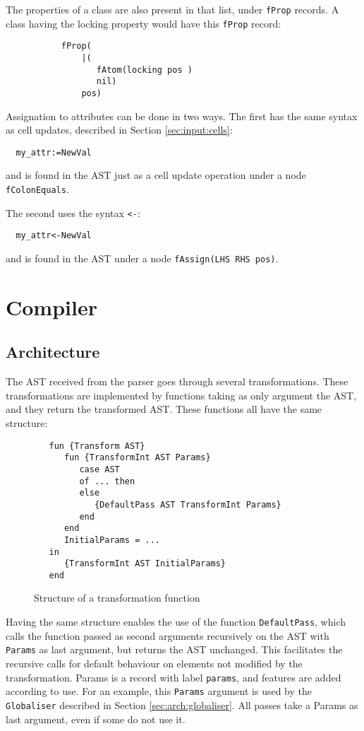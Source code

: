 \documentclass[a4paper]{memoir}
\begin{document}
The properties of a class are also present in that list, under \lstinline!fProp!
records. A class having the locking property would have this \lstinline!fProp! record:

\begin{lstlisting}
           fProp(
               |(
                  fAtom(locking pos )
                  nil)
               pos)
\end{lstlisting}

Assignation to attributes can be done in two ways. The first has the same syntax
as cell updates, described in Section \ref{sec:input:cells}:
\begin{lstlisting}
  my_attr:=NewVal
\end{lstlisting}
and is found in the AST just as a cell update operation under a node
\lstinline!fColonEquals!.

The second uses the syntax \lstinline!<-!:
\begin{lstlisting}
  my_attr<-NewVal
\end{lstlisting}
and is found in the AST under a node \lstinline!fAssign(LHS RHS pos)!.



\chapter{Compiler}
\section{Architecture}
The AST received from the parser goes through several transformations. These transformations are implemented by functions taking as only argument the AST, and they return the transformed AST.
These functions all have the same structure:
\begin{figure}[h]
\begin{lstlisting}
   fun {Transform AST}
      fun {TransformInt AST Params}
         case AST
         of ... then
         else
            {DefaultPass AST TransformInt Params}
         end
      end
      InitialParams = ...
   in
      {TransformInt AST InitialParams}
   end
\end{lstlisting}
\caption{Structure of a transformation function}
\end{figure}
Having the same structure enables the use of the function \lstinline!DefaultPass!, which calls the function passed as second arguments recursively on the AST with \lstinline!Params! as last argument, but returns the AST unchanged. This facilitates the recursive calls for default behaviour on elements not modified by the transformation.
Params is a record with label \lstinline!params!, and features are added
according to use. For an example, this \lstinline!Params! argument is used by
the \lstinline!Globaliser! described in Section \ref{sec:arch:globaliser}. All
passes take a Params as last argument, even if some do not use it. 
\end{document}
